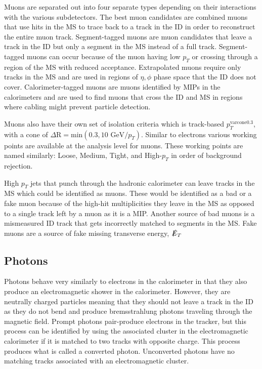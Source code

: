 Muons are separated out into four separate types depending on their interactions with the various subdetectors.  The best muon candidates are combined muons that use hits in the MS to trace back to a track in the ID in order to reconstruct the entire muon track.  Segment-tagged muons are muon candidates that leave a track in the ID but only a segment in the MS instead of a full track.  Segment-tagged muons can occur because of the muon having low $p_T$ or crossing through a region of the MS with reduced acceptance.  Extrapolated muons require only tracks in the MS and are used in regions of $\eta, \phi$ phase space that the ID does not cover.  Calorimeter-tagged muons are muons identified by MIPs in the calorimeters and are used to find muons that cross the ID and MS in regions where cabling might prevent particle detection.

Muons also have their own set of isolation criteria which is track-based $p_{T}^{\text{varcone0.3}}$, with a cone of $\Delta \text{R} = \text{min}(0.3,10\text{ GeV}/p_T)$.  Similar to electrons various working points are available at the analysis level for muons.  These working points are named similarly: Loose, Medium, Tight, and High-$p_T$ in order of background rejection.  

High $p_T$ jets that punch through the hadronic calorimeter can leave tracks in the MS which could be identified as muons.  These would be identified as a bad or a fake muon because of the high-hit multiplicities they leave in the MS as opposed to a single track left by a muon as it is a MIP.  Another source of bad muons is a mismeasured ID track that gets incorrectly matched to segments in the MS.  Fake muons are a source of fake missing transverse energy, $ \slashed{E}_T$

\subsection{Photons}
Photons behave very similarly to electrons in the calorimeter in that they also produce an electromagnetic shower in the calorimeter.  However, they are neutrally charged particles meaning that they should not leave a track in the ID as they do not bend and produce bremsstrahlung photons traveling through the magnetic field.  Prompt photons pair-produce electrons in the tracker, but this process can be identified by using the associated cluster in the electromagnetic calorimeter if it is matched to two tracks with opposite charge.  This process produces what is called a converted photon.  Unconverted photons have no matching tracks associated with an electromagnetic cluster.   

